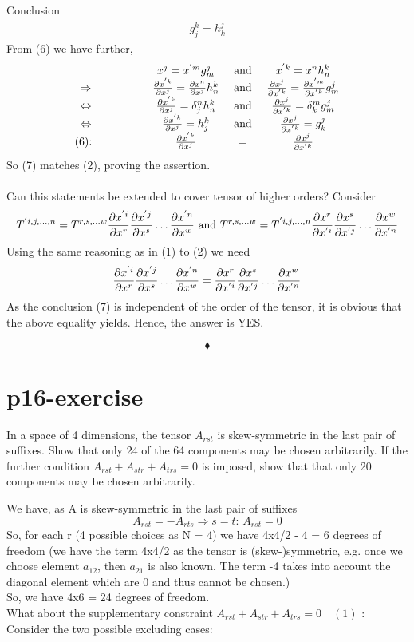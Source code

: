 Conclusion 
\begin{align}
g_j^k =  h_k^j
\end{align}
From (6) we have further,
\begin{align}
\begin{matrix}
& x^{j} = x^{'m} g_m^j &\text{ and }& x^{'k} = x^{n} h_n^k\\
\Rightarrow \quad\quad\quad\quad &\pdv{x^{'k}}{x^j} = \pdv{x^{n}}{x^j} h_n^k  &\text{ and }&\pdv{x^{j}}{x^{'k}} = \pdv{x^{'m}}{x^{'k}}g_m^j\\
\Leftrightarrow \quad\quad\quad\quad &\pdv{x^{'k}}{x^j} = \delta^n_j h_n^k  &\text{ and } &\pdv{x^{j}}{x^{'k}} = \delta^m_k g_m^j\\
\Leftrightarrow \quad\quad\quad\quad &\pdv{x^{'k}}{x^j} = h_j^k  &\text{ and }& \pdv{x^{j}}{x^{'k}} = g_k^j\\
\text{(6): }\quad\quad\quad\quad &\pdv{x^{'k}}{x^j} &=& \pdv{x^{j}}{x^{'k}}
\end{matrix}
\end{align}
So (7) matches (2), proving the assertion.\\\\
Can this statements be extended to cover tensor of higher orders?
Consider
$$T^{'i,j,\dots ,n}= T^{r,s,\dots w} \pdv{x^{'i}}{x^{r}}\pdv{x^{'j}}{x^{s}}\dots \pdv{x^{'n}}{x^{w}} \text{ and } T^{r,s,\dots w}= T^{'i,j,\dots ,n} \pdv{x^{r}}{x^{'i}}\pdv{x^{s}}{x^{'j}}\dots \pdv{x^{w}}{x^{'n}}$$
Using the same reasoning as in (1) to (2) we need
$$\pdv{x^{'i}}{x^{r}}\pdv{x^{'j}}{x^{s}}\dots \pdv{x^{'n}}{x^{w}} =\pdv{x^{r}}{x^{'i}}\pdv{x^{s}}{x^{'j}}\dots \pdv{x^{w}}{x^{'n}}$$
As the conclusion (7) is independent of the order of the tensor, it is obvious that the above equality yields. Hence, the answer is YES.

$$\blacklozenge$$
\pagebreak[4]

\section{p16-exercise}

\begin{tcolorbox}
In a space of 4 dimensions, the tensor $A_{rst}$ is skew-symmetric in the last pair of suffixes. Show that only 24 of the 64 components may be chosen arbitrarily. If the further condition
$A_{rst} + A_{str}+A_{trs} =0$
is imposed, show that that only 20 components may be chosen arbitrarily.

\end{tcolorbox}
We have, as A is skew-symmetric in the last pair of suffixes
$$A_{rst} = -A_{rts}  \Rightarrow s=t \text{: } A_{rst} = 0 $$
So, for each r (4 possible choices as N = 4) we have 4x4/2 - 4 = 6 degrees of freedom (we have the term 4x4/2  as the tensor is (skew-)symmetric, e.g. once we choose element $a_{12}$, then $a_{21}$ is also known. The term -4 takes into account the diagonal element which are 0 and thus cannot be chosen.)\\
So, we have 4x6 = 24 degrees of freedom.\\
What about the supplementary constraint $A_{rst} + A_{str}+A_{trs} =0 \quad (1)$       :\\
Consider the two possible excluding cases:\\

